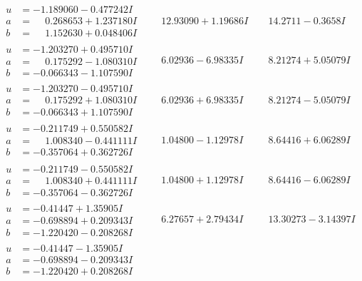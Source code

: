 \documentclass[1p]{elsarticle_modified}
\theoremstyle{definition}
\begin{document}
$$\begin{array}{c|c|c}
\begin{aligned}
u &= -1.189060 - 0.477242 I \\
a &= \phantom{-}0.268653 + 1.237180 I \\
b &= \phantom{-}1.152630 + 0.048406 I\end{aligned}
 & \phantom{-}12.93090 + 1.19686 I & \phantom{-}14.2711 - 0.3658 I \\ \hline\begin{aligned}
u &= -1.203270 + 0.495710 I \\
a &= \phantom{-}0.175292 - 1.080310 I \\
b &= -0.066343 - 1.107590 I\end{aligned}
 & \phantom{-}6.02936 - 6.98335 I & \phantom{-}8.21274 + 5.05079 I \\ \hline\begin{aligned}
u &= -1.203270 - 0.495710 I \\
a &= \phantom{-}0.175292 + 1.080310 I \\
b &= -0.066343 + 1.107590 I\end{aligned}
 & \phantom{-}6.02936 + 6.98335 I & \phantom{-}8.21274 - 5.05079 I \\ \hline\begin{aligned}
u &= -0.211749 + 0.550582 I \\
a &= \phantom{-}1.008340 - 0.441111 I \\
b &= -0.357064 + 0.362726 I\end{aligned}
 & \phantom{-}1.04800 - 1.12978 I & \phantom{-}8.64416 + 6.06289 I \\ \hline\begin{aligned}
u &= -0.211749 - 0.550582 I \\
a &= \phantom{-}1.008340 + 0.441111 I \\
b &= -0.357064 - 0.362726 I\end{aligned}
 & \phantom{-}1.04800 + 1.12978 I & \phantom{-}8.64416 - 6.06289 I \\ \hline\begin{aligned}
u &= -0.41447 + 1.35905 I \\
a &= -0.698894 + 0.209343 I \\
b &= -1.220420 - 0.208268 I\end{aligned}
 & \phantom{-}6.27657 + 2.79434 I & \phantom{-}13.30273 - 3.14397 I \\ \hline\begin{aligned}
u &= -0.41447 - 1.35905 I \\
a &= -0.698894 - 0.209343 I \\
b &= -1.220420 + 0.208268 I\end{aligned}

\end{array}$$
\end{document}
